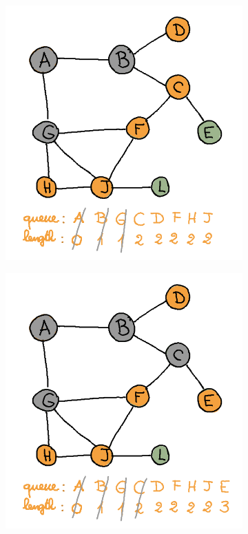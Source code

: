 \begin{enumerate}[(a)]
\begin{figure}[H]
\begin{subfigure}[h]{0.45\textwidth}
    \end{subfigure}
    \qquad
    \begin{subfigure}[h]{0.45\textwidth}
    \raggedleft
    \includegraphics[width=\textwidth]{Pictures/SP/panda_gebissen_3.png}
    \end{subfigure}
\end{figure}
\begin{figure}[H]\ContinuedFloat
    \begin{subfigure}[h]{0.45\textwidth}
    \includegraphics[width=\textwidth]{Pictures/SP/panda_gebissen_4.png}

\end{subfigure}
\end{figure}
\end{enumerate}
